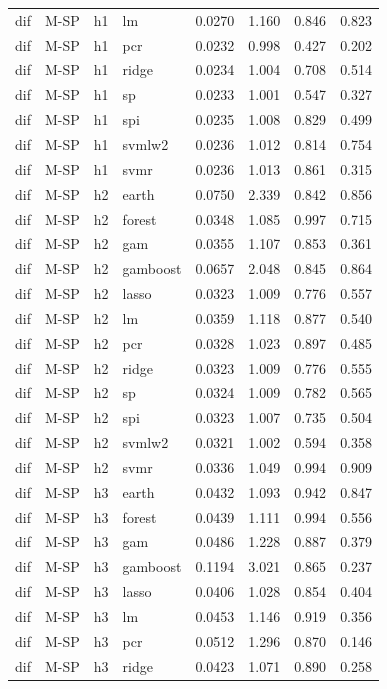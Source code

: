 \begin{ThreePartTable}
\begin{longtable}[t]{llclcccc}
dif & M-SP & h1 & lm & 0.0270 & 1.160 & 0.846 & 0.823\\
dif & M-SP & h1 & pcr & 0.0232 & 0.998 & 0.427 & 0.202\\
dif & M-SP & h1 & ridge & 0.0234 & 1.004 & 0.708 & 0.514\\
dif & M-SP & h1 & sp & 0.0233 & 1.001 & 0.547 & 0.327\\
dif & M-SP & h1 & spi & 0.0235 & 1.008 & 0.829 & 0.499\\
dif & M-SP & h1 & svmlw2 & 0.0236 & 1.012 & 0.814 & 0.754\\
dif & M-SP & h1 & svmr & 0.0236 & 1.013 & 0.861 & 0.315\\
\addlinespace
dif & M-SP & h2 & earth & 0.0750 & 2.339 & 0.842 & 0.856\\
dif & M-SP & h2 & forest & 0.0348 & 1.085 & 0.997 & 0.715\\
dif & M-SP & h2 & gam & 0.0355 & 1.107 & 0.853 & 0.361\\
dif & M-SP & h2 & gamboost & 0.0657 & 2.048 & 0.845 & 0.864\\
dif & M-SP & h2 & lasso & 0.0323 & 1.009 & 0.776 & 0.557\\
dif & M-SP & h2 & lm & 0.0359 & 1.118 & 0.877 & 0.540\\
dif & M-SP & h2 & pcr & 0.0328 & 1.023 & 0.897 & 0.485\\
dif & M-SP & h2 & ridge & 0.0323 & 1.009 & 0.776 & 0.555\\
dif & M-SP & h2 & sp & 0.0324 & 1.009 & 0.782 & 0.565\\
dif & M-SP & h2 & spi & 0.0323 & 1.007 & 0.735 & 0.504\\
dif & M-SP & h2 & svmlw2 & 0.0321 & 1.002 & 0.594 & 0.358\\
dif & M-SP & h2 & svmr & 0.0336 & 1.049 & 0.994 & 0.909\\
\addlinespace
dif & M-SP & h3 & earth & 0.0432 & 1.093 & 0.942 & 0.847\\
dif & M-SP & h3 & forest & 0.0439 & 1.111 & 0.994 & 0.556\\
dif & M-SP & h3 & gam & 0.0486 & 1.228 & 0.887 & 0.379\\
dif & M-SP & h3 & gamboost & 0.1194 & 3.021 & 0.865 & 0.237\\
dif & M-SP & h3 & lasso & 0.0406 & 1.028 & 0.854 & 0.404\\
dif & M-SP & h3 & lm & 0.0453 & 1.146 & 0.919 & 0.356\\
dif & M-SP & h3 & pcr & 0.0512 & 1.296 & 0.870 & 0.146\\
dif & M-SP & h3 & ridge & 0.0423 & 1.071 & 0.890 & 0.258\\

\end{longtable}
\end{ThreePartTable}
